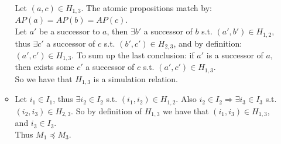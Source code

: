 \documentclass{article}
\begin{document}
\begin{enumerate}[label=\alph*.]
\begin{itemize}
        Let $(a,c)\in H_{1,3}$. The atomic propositions match by: $AP(a)=AP(b)=AP(c)$.\\
        Let $a'$ be a successor to $a$, then $\exists b'$ a successor of $b$ s.t. $(a',b')\in H_{1,2}$,
        thus $\exists c'$ a successor of $c$ s.t. $(b',c')\in H_{2,3}$, and by definition: $(a',c')\in H_{1,3}$.
        To sum up the last conclusion: if $a'$ is a successor of $a$, then exists some $c'$ a successor of $c$ s.t. $(a',c')\in H_{1,3}$.\\
        So we have that $H_{1,3}$ is a simulation relation.
        \item Let $i_1\in I_1$, thus $\exists i_2\in I_2$ s.t. $(i_1,i_2)\in H_{1,2}$.
        Also $i_2\in I_2\Rightarrow \exists i_3\in I_3$ s.t. $(i_2,i_3)\in H_{2,3}$.
        So by definition of $H_{1,3}$ we have that $(i_1,i_3)\in H_{1,3}$, and $i_3\in I_3$.\\
        Thus $M_1\preceq M_3$.

    \end{itemize}
\end{enumerate}
\end{document}
